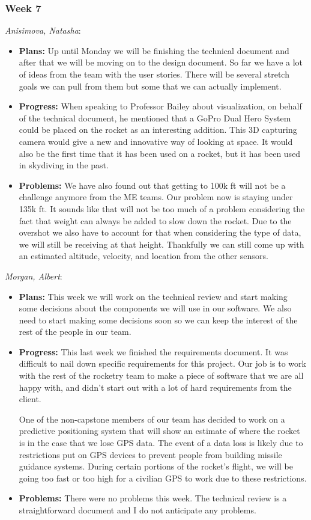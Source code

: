 \documentclass[10pt,draftclsnofoot,onecolumn]{IEEEtran}
\newcommand{\subsubsubsection}[1]{
	\hfill\break\textit{#1}:
}
\begin{document}
\subsubsection{Week 7}
\subsubsubsection{Anisimova, Natasha}
\begin{itemize}
	\item \textbf{Plans: }
	Up until Monday we will be finishing the technical document and after that we will be moving on to the design document. So far we have a lot of ideas from the team with the user stories. There will be several stretch goals we can pull from them but some that we can actually implement.
	\item \textbf{Progress: }
	When speaking to Professor Bailey about visualization, on behalf of the technical document, he mentioned that a GoPro Dual Hero System could be placed on the rocket as an interesting addition. This 3D capturing camera would give a new and innovative way of looking at space. It would also be the first time that it has been used on a rocket, but it has been used in skydiving in the past.
	\item \textbf{Problems: }
	We have also found out that getting to 100k ft will not be a challenge anymore from the ME teams. Our problem now is staying under 135k ft. It sounds like that will not be too much of a problem considering the fact that weight can always be added to slow down the rocket. Due to the overshot we also have to account for that when considering the type of data, we will still be receiving at that height. Thankfully we can still come up with an estimated altitude, velocity, and location from the other sensors.
\end{itemize}
\subsubsubsection{Morgan, Albert}
\begin{itemize}
	\item \textbf{Plans: }
	This week we will work on the technical review and start making some decisions about the components we will use in our software. We also need to start making some decisions soon so we can keep the interest of the rest of the people in our team.
	\item \textbf{Progress: }
	This last week we finished the requirements document. It was difficult to nail down specific requirements for this project. Our job is to work with the rest of the rocketry team to make a piece of software that we are all happy with, and didn't start out with a lot of hard requirements from the client.

	One of the non-capstone members of our team has decided to work on a predictive positioning system that will show an estimate of where the rocket is in the case that we lose GPS data. The event of a data loss is likely due to restrictions put on GPS devices to prevent people from building missile guidance systems. During certain portions of the rocket's flight, we will be going too fast or too high for a civilian GPS to work due to these restrictions.
	\item \textbf{Problems: }
	There were no problems this week. The technical review is a straightforward document and I do not anticipate any problems.
\end{itemize}
\end{document}
